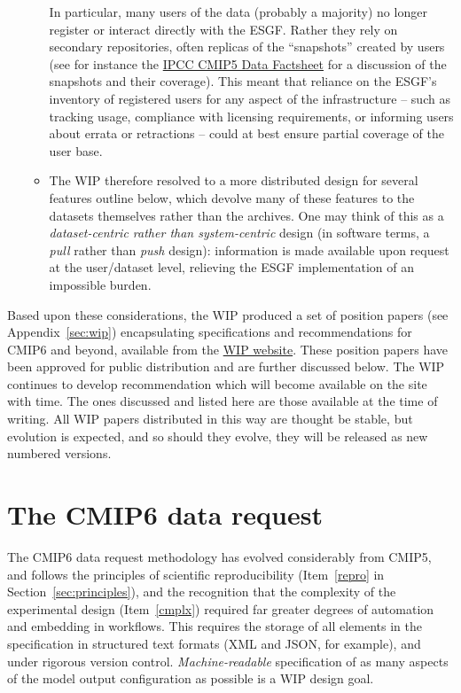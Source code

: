 \documentclass[gmd,manuscript]{copernicus}
\newcommand{\secref}[1] {\mbox{Section  \ref{sec:#1}}}
\newcommand{\appref}[1] {\mbox{Appendix \ref{sec:#1}}}
\begin{document}
\begin{enumerate}
\begin{itemize}
   In particular, many
  users of the data (probably a majority) no longer register or
  interact directly with the ESGF. Rather they rely on secondary
  repositories, often replicas of the ``snapshots'' created by users
  (see for instance the \href{https://goo.gl/34AtW6}{IPCC CMIP5 Data
    Factsheet} for a discussion of the snapshots and their coverage).
  This meant that reliance on the ESGF's inventory of registered users
  for any aspect of the infrastructure -- such as tracking usage,
  compliance with licensing requirements, or informing users about
  errata or retractions -- could at best ensure partial coverage of
  the user base. 
  \item The WIP therefore resolved to a more distributed
  design for several features outline below, which devolve many of
  these features to the datasets themselves rather than the archives.
  One may think of this as a \emph{dataset-centric rather than
    system-centric} design (in software terms, a \emph{pull} rather
  than \emph{push} design): information is made available upon request
  at the user/dataset level, relieving the ESGF implementation of an
  impossible burden.
  \end{itemize}
\end{enumerate}

Based upon these considerations, the WIP produced a set of
position papers (see \appref{wip}) encapsulating specifications and recommendations for CMIP6
and beyond, available from the
\href{https://www.earthsystemcog.org/projects/wip/}{WIP website}. 
These position papers have been approved for public distribution and are further
discussed below. The
WIP continues to develop recommendation which will become available
on the site with time. The ones discussed and listed 
 here are those available at the time of
writing. All WIP papers distributed in this way are thought be stable, but
evolution is expected, and so should they evolve, they will be released as new numbered
 versions.

\section{The CMIP6 data request}
\label{sec:dreq}

The CMIP6 data request methodology has evolved considerably from
CMIP5, and follows the principles of scientific reproducibility
(Item~\ref{repro} in \secref{principles}), and the recognition that
the complexity of the experimental design (Item~\ref{cmplx}) required
far greater degrees of automation and embedding in workflows. This
requires the storage of all elements in the specification in
structured text formats (XML and JSON, for example), and under
rigorous version control. \emph{Machine-readable} specification of as
many aspects of the model output configuration as possible is a WIP
design goal.
\end{document}
